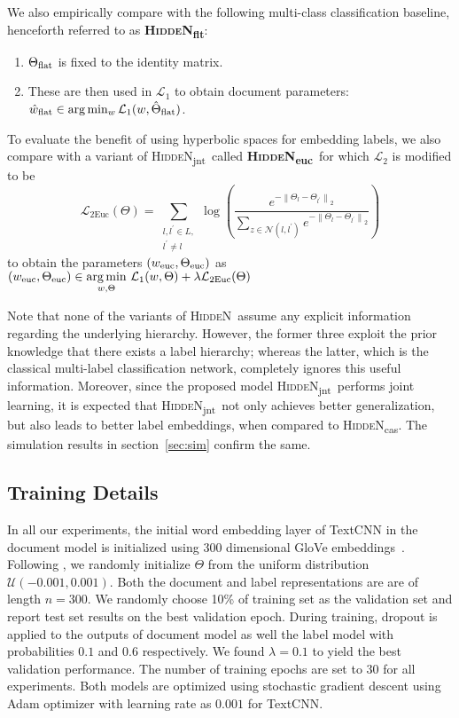 \documentclass[11pt,a4paper]{article}
\def\calN{\mathcal{N}}
\def\calL{\mathcal{L}}
\newcommand{\model}{\mbox{\textsc{HiddeN}}}
\newcommand{\modeljnt}{\mbox{\textsc{HiddeN}\textsubscript{jnt}}}
\newcommand{\modelcas}{\mbox{\textsc{HiddeN}\textsubscript{cas}}}
\newcommand{\modelflt}{\mbox{\textsc{HiddeN}\textsubscript{flt}}}
\newcommand{\modeleuc}{\mbox{\textsc{HiddeN}\textsubscript{euc}}}
\begin{document}
We also empirically compare with the following multi-class classification baseline, henceforth referred to as \textbf{\modelflt}:
\begin{enumerate}[label=(\arabic*),topsep=0pt,itemsep=-1ex,partopsep=1ex,parsep=1ex,leftmargin=*]
    \item $\Theta_{\textup{flat}}$ is fixed to the identity matrix.
    \item These are then used in $\calL_1$ to obtain document parameters: $\hat{w}_\textup{flat}\in\arg\min_{w}\calL_1(w,\hat{\Theta}_\textup{flat})$. 
\end{enumerate}

To evaluate the benefit of using hyperbolic spaces for embedding labels, we also compare with a variant of \modeljnt\ called \textbf{\modeleuc}\ for which $\calL_2$ is modified to be
\begin{equation}
    \calL_{2\text{Euc}}(\Theta) = \sum_{\substack{l, l^\prime \in L,\\l^{\prime}\ne l}}
    \log\left(\frac{e^{-\left\|\Theta_l - \Theta_{l^\prime}\right\|_2}}{\sum\limits_{z\in\calN\left(l, l^{\prime}\right)}e^{-\left\|\Theta_l - \Theta_{l^\prime}\right\|_2}}\right)
    \label{eq:comp2euc}
\end{equation}
to obtain the parameters $(w_{\textup{euc}},\Theta_{\textup{euc}})$ as $(w_{\textup{euc}},\Theta_{\textup{euc}})\in\underset{w,\Theta}{\arg\min}\ \calL_1(w,\Theta) + \lambda \calL_{2\text{Euc}}(\Theta)$

Note that none of the variants of \model\ assume any explicit information regarding the underlying hierarchy. However, the former three exploit the prior knowledge that there exists a label hierarchy; whereas the latter, which is the classical multi-label classification network, completely ignores this useful information. Moreover, since the proposed model \modeljnt\ performs joint learning, it is expected that \modeljnt\ not only achieves better generalization, but also leads to better label embeddings, when compared to \modelcas. The simulation results in section~\ref{sec:sim} confirm the same.

\subsection{Training Details}
In all our experiments, the initial word embedding layer of TextCNN in the document model is initialized using 300 dimensional GloVe embeddings~\citep{glove}. Following \citet{poincare}, we randomly initialize $\Theta$ from the uniform distribution $\mathcal{U}(-0.001, 0.001)$. Both the document and label representations are are of length $n=300$. We randomly choose 10\% of training set as the validation set and report test set results on the best validation epoch. During training, dropout is applied to the outputs of document model as well the label model with probabilities $0.1$ and $0.6$ respectively. We found $\lambda=0.1$ to yield the best validation performance. The number of training epochs are set to $30$ for all experiments. Both models are optimized using stochastic gradient descent using Adam optimizer \citep{kingma2014adam} with learning rate as $0.001$ for TextCNN.
\end{document}

